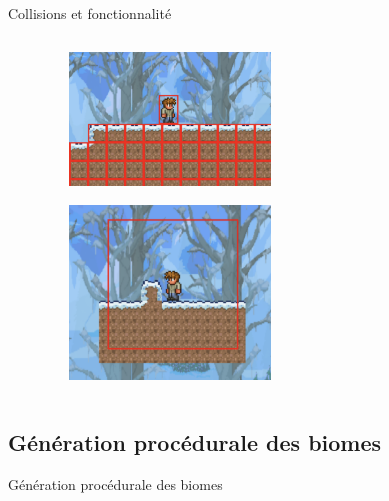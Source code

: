 \documentclass[aspectratio=169]{beamer}
\begin{document}
\begin{frame}{Collisions et fonctionnalité}
    \begin{columns}
        \centering
        \begin{column}{0.5\textwidth}
            \centering
            \lipsum[1][1-5]
        \end{column}
        \begin{column}{0.5\textwidth}
            \centering
            \begin{figure}
                \centering
                \captionsetup{format=sanslabel}
                \includegraphics[width=0.5\textwidth]{assets/hit_box.png}
            \end{figure}
            \begin{figure}
                \centering
                \captionsetup{format=sanslabel}
                \includegraphics[width=0.5\textwidth]{assets/camera.png}
            \end{figure}
        \end{column}
    \end{columns}
\end{frame}

\subsection{Génération procédurale des biomes}

\begin{frame}{Génération procédurale des biomes}
    
\end{frame}
\end{document}
